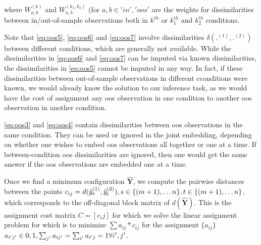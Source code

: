 \documentclass[12pt,oneside,final]{thesis}\usepackage[]{graphicx}\usepackage[]{color}
\begin{document}
where $W_{a,b}^{(k)}$ and $W_{a,b}^{(k_1,k_2)}$ (for $a,b \in {'in', 'oos'}$ are the weights for dissimilarities between in/out-of-sample observations both in $k^{th}$ or $k_1^{th}$ and $k_2^{th}$ conditions.

Note that \ref{eq:oos5}, \ref{eq:oos6} and \ref{eq:oos7} involve dissimilarities $\delta(.^{(1)},.^{(2)})$ between different conditions, which are generally not available. While  the dissimilarities in \ref{eq:oos6} and \ref{eq:oos7} can be imputed via known dissimilarities, the dissimilarities in \ref{eq:oos5}  cannot be imputed in any way. In fact, if these dissimilarities between out-of-sample observations in different cconditions were known, we would already know the solution to our inference task, as we would have the cost of assignment any oos observation in one condition to another oos observation in another condition.

\ref{eq:oos3} and \ref{eq:oos4} contain dissimilarities between oos observations in the same condition. They can be  used or ignored in the joint embedding, depending on whether one wishes to embed oos observations all together or one at a time. If between-condition oos dissimilarities are ignored, then one would get the same answer if the oos observations are embedded one at a time.

Once we find a minimum configuration ${ \hat{\mathbf{Y}}}$, we compute the pairwise distances between the points $c_{ij}=d(\yhat^{(1)}_s,\yhat^{(2)}_t),\onespace s \in \{(m+1),\ldots n\}, t \in  \{(m+1),\ldots n\}$, which corresponds to the off-diagonal block matrix of $d({ \hat{\mathbf{Y}}})$. This is the assignment cost matrix $C=\left[c_ij \right]$ for which we solve the linear assignment problem for which is to minimize $\sum a_{ij}*c_{ij}$  for the assignment $\{a_{ij}\}$
$a_{i'j'} \in {0,1},\onespace \sum_{j'} a_{ij'} =\sum_{i'} a_{i'j} =1 \onespace \forall i',j'$.
 
\end{document}
